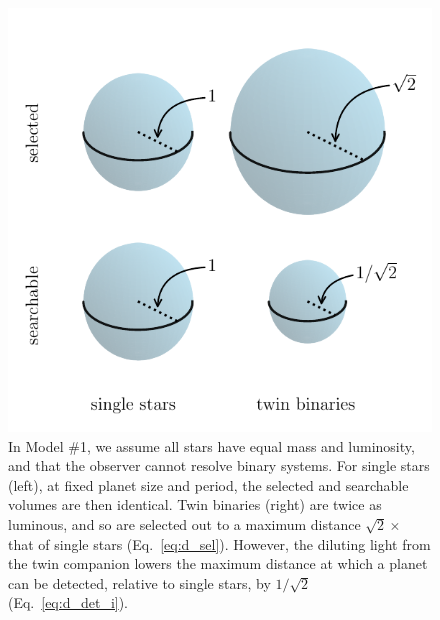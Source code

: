 \newpage
\begin{figure}
    \begin{center}
        \includegraphics[width=\textwidth]{figures/visualize_volumes.pdf}
    \end{center}
    \caption{
    In Model \#1, we assume all stars have equal mass and luminosity, and that 
    the observer cannot resolve binary systems.
    For single stars (left), at fixed planet size and period, the 
    selected and searchable volumes are then identical.
    Twin binaries (right) are twice as luminous, and so are selected 
    out to a maximum distance $\sqrt{2}\times$ that of single stars 
    (Eq.~\ref{eq:d_sel}).
    However, the diluting light from the twin companion lowers the maximum 
    distance at which a planet can be detected, relative to single stars, by 
    $1/\sqrt{2}$ (Eq.~\ref{eq:d_det_i}).
    }
    \label{fig:model_1_volumes}
\end{figure}


